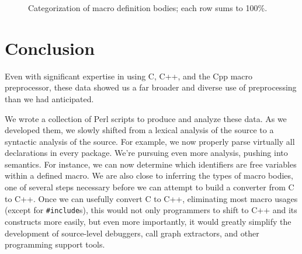 \documentclass[11pt]{article}
\begin{document}
\begin{figure}
{\small
  \setlength{\tabcolsep}{.25em}
}
\caption{Categorization of macro definition bodies; each row sums to 100\%.}
\label{fig:categorization}
\end{figure}








\section{Conclusion}
\label{sec:discussion}

Even with significant expertise in using C, C++, and the Cpp macro
preprocessor, these data showed us a far broader and diverse use of
preprocessing than we had anticipated.  

We wrote a collection of Perl scripts to produce and analyze these
data.  As we developed them, we slowly shifted from a lexical analysis
of the source to a syntactic analysis of the source.  For example, we
now properly parse virtually all declarations in every package.  We're
pursuing even more analysis, pushing into semantics.  For instance, we
can now determine which identifiers are free variables within a
defined macro.  We are also close to inferring the types of
macro bodies, one of several steps necessary before we
can attempt to build a converter from C to C++.  Once we can usefully
convert C to C++, eliminating most macro usages (except for
{\tt \#include}s), this would not only programmers to shift to C++ and
its constructs more easily, but even more importantly, it would
greatly simplify the development of source-level debuggers, call graph
extractors, and other programming support tools.

%

{\small }
\end{document}
